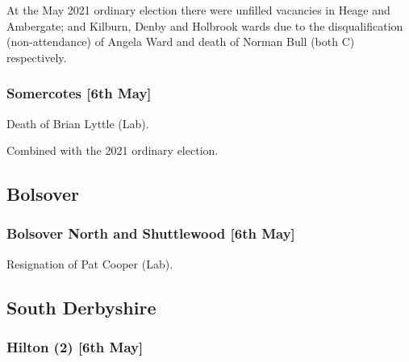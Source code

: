 \documentclass[a4paper,openany]{book}
\begin{document}
\begin{resultsiii}
At the May 2021 ordinary election there were unfilled vacancies in Heage and Ambergate; and Kilburn, Denby and Holbrook wards due to the disqualification (non-attendance) of Angela Ward and death of Norman Bull (both C) respectively.

\subsubsection*{Somercotes \hspace*{\fill}\nolinebreak[1]%
	\enspace\hspace*{\fill}
	[6th May]}


Death of Brian Lyttle (Lab).

Combined with the 2021 ordinary election.

\subsection*{Bolsover}

\subsubsection*{Bolsover North and Shuttlewood \hspace*{\fill}\nolinebreak[1]%
	\enspace\hspace*{\fill}
	[6th May]}


Resignation of Pat Cooper (Lab).

\subsection*{South Derbyshire}

\subsubsection*{Hilton (2) \hspace*{\fill}\nolinebreak[1]%
	\enspace\hspace*{\fill}
	[6th May]}


\end{resultsiii}
\end{document}
